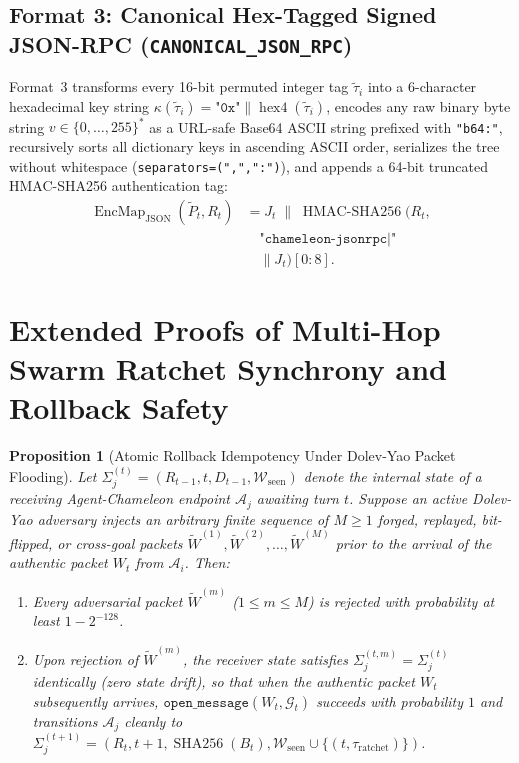 \documentclass[conference,10pt]{IEEEtran}
\newtheorem{proposition}{Proposition}
\begin{document}
\subsection{Format 3: Canonical Hex-Tagged Signed JSON-RPC (\texttt{CANONICAL\_JSON\_RPC})}
Format~3 transforms every 16-bit permuted integer tag $\tilde{\tau}_i$ into a 6-character hexadecimal key string $\kappa(\tilde{\tau}_i) = \texttt{"0x"} \parallel \operatorname{hex4}(\tilde{\tau}_i)$, encodes any raw binary byte string $v \in \{0,\dots,255\}^*$ as a URL-safe Base64 ASCII string prefixed with \texttt{"b64:"}, recursively sorts all dictionary keys in ascending ASCII order, serializes the tree without whitespace (\texttt{separators=(",",":")}), and appends a 64-bit truncated HMAC-SHA256 authentication tag:
\begin{equation}
\label{eq:jsonrpc_mac}
\begin{aligned}
\operatorname{EncMap}_{\text{JSON}}(\tilde{P}_t, R_t) &= J_t \;\parallel\; \operatorname{HMAC-SHA256}\big(R_t, \\
&\quad \texttt{"chameleon-jsonrpc|"} \\
&\quad \parallel J_t\big)[0:8].
\end{aligned}
\end{equation}

\section{Extended Proofs of Multi-Hop Swarm Ratchet Synchrony and Rollback Safety}
\label{app:proofs}

\begin{proposition}[Atomic Rollback Idempotency Under Dolev-Yao Packet Flooding]
\label{prop:rollback}
Let $\Sigma_j^{(t)} = (R_{t-1}, t, D_{t-1}, \mathcal{W}_{\text{seen}})$ denote the internal state of a receiving Agent-Chameleon endpoint $\mathcal{A}_j$ awaiting turn $t$. Suppose an active Dolev-Yao adversary injects an arbitrary finite sequence of $M \ge 1$ forged, replayed, bit-flipped, or cross-goal packets $\tilde{W}^{(1)}, \tilde{W}^{(2)}, \dots, \tilde{W}^{(M)}$ prior to the arrival of the authentic packet $W_t$ from $\mathcal{A}_i$. Then:
\begin{enumerate}
    \item Every adversarial packet $\tilde{W}^{(m)}$ ($1 \le m \le M$) is rejected with probability at least $1 - 2^{-128}$.
    \item Upon rejection of $\tilde{W}^{(m)}$, the receiver state satisfies $\Sigma_j^{(t, m)} = \Sigma_j^{(t)}$ identically (zero state drift), so that when the authentic packet $W_t$ subsequently arrives, $\texttt{open\_message}(W_t, \mathcal{G}_t)$ succeeds with probability $1$ and transitions $\mathcal{A}_j$ cleanly to $\Sigma_j^{(t+1)} = (R_t, t+1, \operatorname{SHA256}(B_t), \mathcal{W}_{\text{seen}} \cup \{(t, \tau_{\text{ratchet}})\})$.
\end{enumerate}
\end{proposition}
\end{document}
